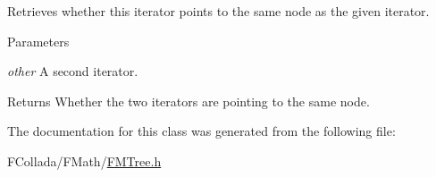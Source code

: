 \label{classfm_1_1tree_1_1iterator_ad214b7f65df9300b05b4245c16baa13b}
Retrieves whether this iterator points to the same node as the given iterator. 
\begin{DoxyParams}{Parameters}
\item[{\em other}]A second iterator. \end{DoxyParams}
\begin{DoxyReturn}{Returns}
Whether the two iterators are pointing to the same node. 
\end{DoxyReturn}


The documentation for this class was generated from the following file:\begin{DoxyCompactItemize}
\item 
FCollada/FMath/\hyperlink{FMTree_8h}{FMTree.h}\end{DoxyCompactItemize}
